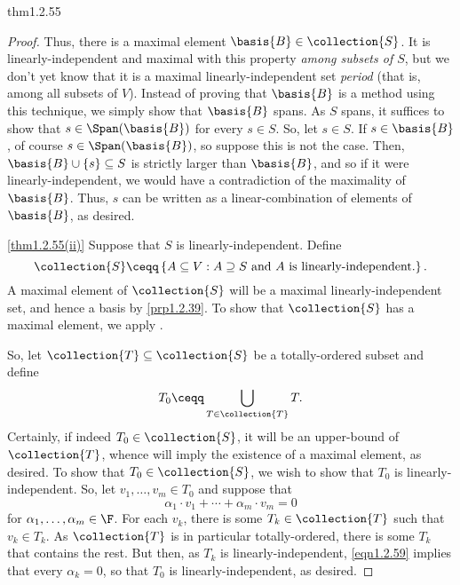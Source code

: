\begin{prp}{}{thm1.2.55}
\begin{proof}
		Thus, there is a maximal element $\basis{B}\in \collection{S}$.  It is linearly-independent and maximal with this property \emph{among subsets of $S$}, but we don't yet know that it is a maximal linearly-independent set \emph{period} (that is, among all subsets of $V$).  Instead of proving that $\basis{B}$ is a method using this technique, we simply show that $\basis{B}$ spans.  As $S$ spans, it suffices to show that $s\in \Span (\basis{B})$ for every $s\in S$.  So, let $s\in S$.  If $s\in \basis{B}$, of course $s\in \Span (\basis{B})$, so suppose this is not the case.  Then, $\basis{B}\cup \{ s\} \subseteq S$ is strictly larger than $\basis{B}$, and so if it were linearly-independent, we would have a contradiction of the maximality of $\basis{B}$.  Thus, $s$ can be written as a linear-combination of elements of $\basis{B}$, as desired.
		
		\blni
		\cref{thm1.2.55(ii)} Suppose that $S$ is linearly-independent.  Define
		\begin{equation}
			\collection{S}\ceqq \left\{ A\subseteq V:A\supseteq S\text{ and }A\text{ is linearly-independent.}\right\} .
		\end{equation}
		A maximal element of $\collection{S}$ will be a maximal linearly-independent set, and hence a basis by \cref{prp1.2.39}.  To show that $\collection{S}$ has a maximal element, we apply .
		
		So, let $\collection{T}\subseteq \collection{S}$ be a totally-ordered subset and define
		\begin{equation}
		T_0\ceqq \bigcup _{T\in \collection{T}}T.
		\end{equation}
		Certainly, if indeed $T_0\in \collection{S}$, it will be an upper-bound of $\collection{T}$, whence  will imply the existence of a maximal element, as desired.  To show that $T_0\in \collection{S}$, we wish to show that $T_0$ is linearly-independent.  So, let $v_1,\ldots ,v_m\in T_0$ and suppose that
		\begin{equation}\label{eqn1.2.59}
		\alpha _1\cdot v_1+\cdots +\alpha _m\cdot v_m=0
		\end{equation}
		for $\alpha _1,\ldots ,\alpha _m\in \F$.  For each $v_k$, there is some $T_k\in \collection{T}$ such that $v_k\in T_k$.  As $\collection{T}$ is in particular totally-ordered, there is some $T_k$ that contains the rest.  But then, as $T_k$ is linearly-independent, \eqref{eqn1.2.59} implies that every $\alpha _k=0$, so that $T_0$ is linearly-independent, as desired.
	\end{proof}
\end{prp}
